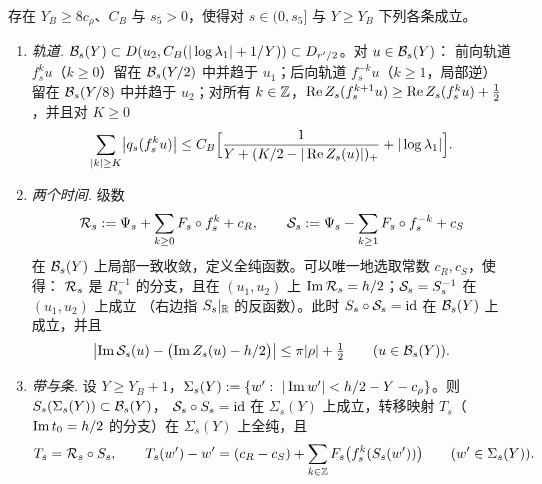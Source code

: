 \begin{lemma}[带]\label{ch7:lem:band}
存在 $Y_B\ge 8c_\rho$、$C_B$ 与 $s_5>0$，使得对 $s\in(0,s_5]$ 与 $Y\ge Y_B$ 下列各条成立。
\begin{enumerate}
\item \emph{轨道.} $\mathcal B_s(Y)\subset D(u_2,C_B(|\log\lambda_1|+1/Y))\subset D_{r'/2}$。对 $u\in\mathcal B_s(Y)$：
  前向轨道 $f_s^ku$（$k\ge0$）留在 $\mathcal B_s(Y/2)$ 中并趋于 $u_1$；后向轨道 $f_s^{-k}u$（$k\ge1$，局部逆）
  留在 $\mathcal B_s(Y/8)$ 中并趋于 $u_2$；对所有 $k\in\mathbb{Z}$，$\operatorname{Re} Z_s(f_s^{k+1}u)\ge\operatorname{Re} Z_s(f_s^ku)+\frac12$，并且对 $K\ge0$
  \begin{equation}\label{ch7:eq:band-sum}
   \sum_{|k|\ge K}\bigl|q_s(f_s^ku)\bigr|\le C_B\Bigl[\frac1{Y+(K/2-|\operatorname{Re} Z_s(u)|)_+}+|\log\lambda_1|\Bigr].
  \end{equation}
\item \emph{两个时间.} 级数
  \[
   \mathcal R_s:=\Psi_s+\sum_{k\ge0}F_s\circ f_s^k+c_R,\qquad
   \mathcal S_s:=\Psi_s-\sum_{k\ge1}F_s\circ f_s^{-k}+c_S
  \]
  在 $\mathcal B_s(Y)$ 上局部一致收敛，定义全纯函数。可以唯一地选取常数 $c_R,c_S$，使得：
  $\mathcal R_s$ 是 $R_s^{-1}$ 的分支，且在 $(u_1,u_2)$ 上 $\operatorname{Im}\mathcal R_s=h/2$；$\mathcal S_s=S_s^{-1}$ 在 $(u_1,u_2)$ 上成立
  （右边指 $S_s|_{\mathbb{R}}$ 的反函数）。此时 $S_s\circ\mathcal S_s=\mathrm{id}$ 在 $\mathcal B_s(Y)$ 上成立，并且
  \begin{equation}\label{ch7:eq:ImS}
   \bigl|\operatorname{Im}\mathcal S_s(u)-\bigl(\operatorname{Im} Z_s(u)-h/2\bigr)\bigr|\le\pi|\rho|+\tfrac12\qquad(u\in\mathcal B_s(Y)).
  \end{equation}
\item \emph{带与条.} 设 $Y\ge Y_B+1$，$\Sigma_s(Y):=\{w':\ |\operatorname{Im} w'|<h/2-Y-c_\rho\}$。则 $S_s(\Sigma_s(Y))\subset\mathcal B_s(Y)$，
  $\mathcal S_s\circ S_s=\mathrm{id}$ 在 $\Sigma_s(Y)$ 上成立，转移映射 $T_s$（$\operatorname{Im} t_0=h/2$ 的分支）在 $\Sigma_s(Y)$ 上全纯，且
  \[
   T_s=\mathcal R_s\circ S_s,\qquad T_s(w')-w'=(c_R-c_S)+\sum_{k\in\mathbb{Z}}F_s\bigl(f_s^k(S_s(w'))\bigr)\qquad(w'\in\Sigma_s(Y)).
  \]
\end{enumerate}
\end{lemma}

